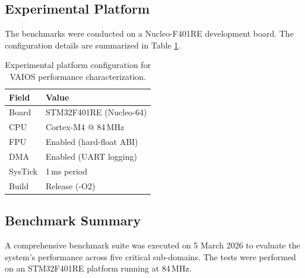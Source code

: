 \subsection{Experimental Platform}
The benchmarks were conducted on a Nucleo-F401RE development board. The configuration details are summarized in Table \ref{tab:bench_platform}.

\begin{table}[H]
    \centering
    \small
    \begin{tabular}{|l|l|}
        \hline
        \textbf{Field} & \textbf{Value} \\
        \hline
        Board & STM32F401RE (Nucleo-64) \\
        CPU & Cortex-M4 @ 84\,MHz \\
        FPU & Enabled (hard-float ABI) \\
        DMA & Enabled (UART logging) \\
        SysTick & 1\,ms period \\
        Build & Release (-O2) \\
        \hline
    \end{tabular}
    \caption{Experimental platform configuration for VAIOS performance characterization.}
    \label{tab:bench_platform}
\end{table}

\subsection{Benchmark Summary}
A comprehensive benchmark suite was executed on 5 March 2026 to evaluate the system's performance across five critical sub-domains. The tests were performed on an STM32F401RE platform running at 84\,MHz.

